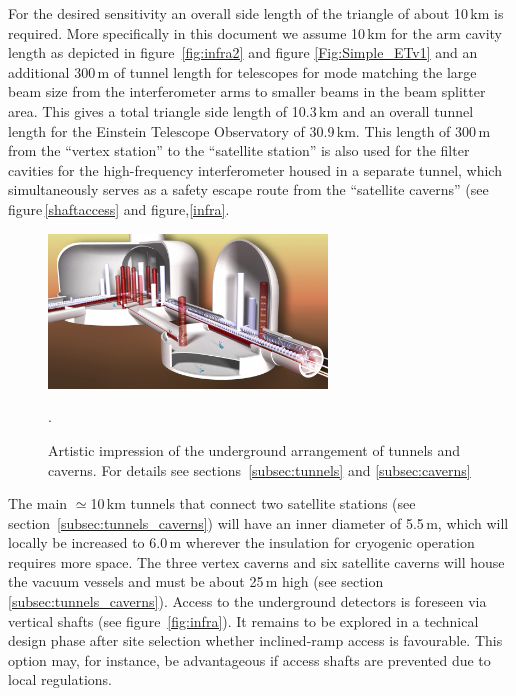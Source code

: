 For the desired sensitivity an overall side length of the triangle of about 10\,km is required. More specifically in this document we assume 10\,km for the arm cavity length as depicted in figure~\ref{fig:infra2} and figure \ref{Fig:Simple_ETv1} and an additional 300\,m of tunnel length for telescopes for mode matching the large beam size from the interferometer arms to smaller beams in the beam splitter area. 
This gives a total triangle side length of 10.3\,km and an overall tunnel length for the Einstein Telescope Observatory of 30.9\,km. This length of 300\,m from the ``vertex station'' to the ``satellite station'' is also used for the filter cavities for the high-frequency interferometer housed in a separate tunnel, which simultaneously serves as a safety escape route from the ``satellite caverns'' (see figure\,\ref{shaftaccess} and figure,\ref{infra}.  
\begin{figure}
	\centering
\vskip 0.1cm
		\includegraphics[width=0.66\textwidth]{Intro/Intro_Figures/ArtisticView1.jpg}
	\caption{Artistic impression of the underground arrangement of tunnels and 
	caverns. For details see sections~\ref{subsec:tunnels} and \ref{subsec:caverns}}.
	\label{fig:Artisticview1}
\end{figure}
The main $\simeq$10\,km tunnels that \mbox{connect} two satellite stations (see section~\ref{subsec:tunnels_caverns}) will have an inner diameter of 5.5\,m, which will \mbox{locally} be increased to 6.0\,m wherever the insulation for \mbox{cryogenic} operation requires more space. The three {\mbox vertex} caverns and six satellite caverns will house the vacuum \mbox{vessels} and must be about 25\,m high (see section \ref{subsec:tunnels_caverns}). 
Access to the \mbox{underground} detectors is foreseen via vertical shafts (see figure~\ref{fig:infra}). It remains to be explored in a technical design phase after site selection whether inclined-ramp access is favourable. This option may, for instance, be advantageous if access shafts are prevented due to local regulations. 

